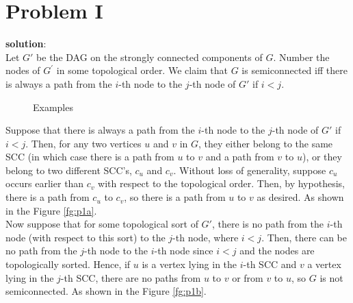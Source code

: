\section{Problem I}
\textbf{solution}:\\
Let $G'$ be the DAG on the strongly connected components of $G$. Number the nodes of $G^{'}$ in some topological order. We claim that $G$ is semiconnected iff there is always a path from the $i$-th node to the $j$-th node of $G'$ if $i < j$.  

\begin{figure}[h]
	\centering
	\caption{Examples}
	\label{fg:p1}
\end{figure}

Suppose that there is always a path from the $i$-th node to the $j$-th node of $G'$ if $i < j$. Then, for any two vertices $u$ and $v$ in $G$, they either belong to the same SCC (in which case there is a path from $u$ to $v$ and a path from $v$ to $u$), or they belong to two different SCC's, $c_u$ and $c_v$. Without loss of generality, suppose $c_u$ occurs earlier than $c_v$ with respect to the topological order. Then, by hypothesis, there is a path from $c_u$ to $c_v$, so there is a path from $u$ to $v$ as desired. As shown in the Figure \ref{fg:p1a}.\\

Now suppose that for some topological sort of $G'$, there is no path from the $i$-th node (with respect to this sort) to the $j$-th node, where $i < j$. Then, there can be no path from the $j$-th node to the $i$-th node since $i < j$ and the nodes are topologically sorted. Hence, if $u$ is a vertex lying in the $i$-th SCC and $v$ a vertex lying in the $j$-th SCC, there are no paths from $u$ to $v$ or from $v$ to $u$, so $G$ is not semiconnected. As shown in the Figure \ref{fg:p1b}.\\

